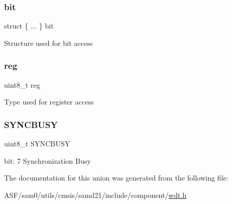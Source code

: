 \subsubsection{\texorpdfstring{bit}{bit}}
{\footnotesize\ttfamily struct \{ ... \}   bit}

Structure used for bit access \mbox{\label{union_w_d_t___s_t_a_t_u_s___type_a9428adc9af4653a2050e2536b55dec8d}} 
\subsubsection{\texorpdfstring{reg}{reg}}
{\footnotesize\ttfamily uint8\+\_\+t reg}

Type used for register access \mbox{\label{union_w_d_t___s_t_a_t_u_s___type_abb30254758e23bd24824e436a1aa8716}} 
\subsubsection{\texorpdfstring{SYNCBUSY}{SYNCBUSY}}
{\footnotesize\ttfamily uint8\+\_\+t S\+Y\+N\+C\+B\+U\+SY}

bit\+: 7 Synchronization Busy 

The documentation for this union was generated from the following file\+:\begin{DoxyCompactItemize}
\item 
A\+S\+F/sam0/utils/cmsis/samd21/include/component/\mbox{\hyperlink{component_2wdt_8h}{wdt.\+h}}\end{DoxyCompactItemize}
